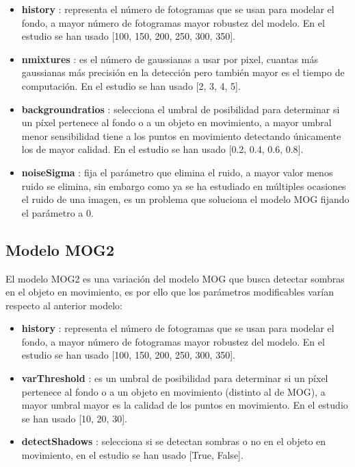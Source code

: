 \documentclass[a4paper,12pt]{article}
\begin{document}
{\vspace{0.5cm}

\begin{itemize}
    \item \textbf{history} : representa el número de fotogramas que se usan para modelar el fondo, a mayor número de fotogramas mayor robustez del modelo. En el estudio se han usado [100, 150, 200, 250, 300, 350].
    \item \textbf{nmixtures} : es el número de gaussianas a usar por pixel, cuantas más gaussianas más precisión en la detección pero también mayor es el tiempo de computación. En el estudio se han usado [2, 3, 4, 5].
    \item \textbf{backgroundratios} : selecciona el umbral de posibilidad para determinar si un píxel pertenece al fondo o a un objeto en movimiento, a mayor umbral menor sensibilidad tiene a los puntos en movimiento detectando únicamente los de mayor calidad. En el estudio se han usado [0.2, 0.4, 0.6, 0.8].
    \item \textbf{noiseSigma} : fija el parámetro que elimina el ruido, a mayor valor menos ruido se elimina, sin embargo como ya se ha estudiado en múltiples ocasiones el ruido de una imagen, es un problema que soluciona el modelo MOG
  fijando el parámetro a 0.
\end{itemize}

\vspace{0.5cm}

\subsection{Modelo MOG2}

\vspace{0.5cm}

El modelo MOG2 es una variación del modelo MOG que busca detectar sombras en el objeto en movimiento, es por ello que los parámetros modificables varían respecto al anterior modelo:

\vspace{0.5cm}

\begin{itemize}
    \item \textbf{history} : representa el número de fotogramas que se usan para modelar el fondo, a mayor número de fotogramas mayor robustez del modelo. En el estudio se han usado [100, 150, 200, 250, 300, 350].
    \item \textbf{varThreshold} : es un umbral de posibilidad para determinar si un píxel pertenece al fondo o a un objeto en movimiento (distinto al de MOG), a mayor umbral mayor es la calidad de los puntos en movimiento. En el estudio se han usado [10, 20, 30].
    \item \textbf{detectShadows} : selecciona si se detectan sombras o no en el objeto en movimiento, en el estudio se han usado [True, False].
\end{itemize}

}
\end{document}
